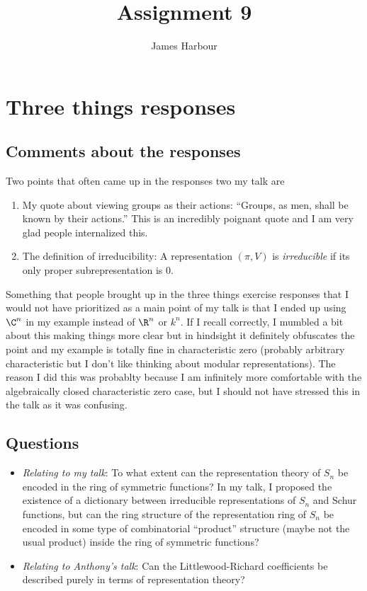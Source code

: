 \documentclass[12pt]{article}
\title{Assignment 9}
\author{James Harbour}
\begin{document}
\maketitle

\section{Three things responses}
\subsection{Comments about the responses}

Two points that often came up in the responses two my talk are
\begin{enumerate}
  \item My quote about viewing groups as their actions: ``Groups, as men, shall be known by their actions.'' This is an incredibly poignant quote and I am very glad people internalized this.
  \item The definition of irreducibility: A representation $ (\pi,V) $ is \textit{irreducible} if its only proper subrepresentation is $ 0 $.
\end{enumerate}

Something that people brought up in the three things exercise responses that I would not have prioritized as a main point of my talk is that I ended up using $ \C^{n} $ in my example instead of $ \R^{n} $ or $ k^{n} $. If I recall correctly, I mumbled a bit about this making things more clear but in hindsight it definitely obfuscates the point and my example is totally fine in characteristic zero (probably arbitrary characteristic but I don't like thinking about modular representations). The reason I did this was probablty because I am infinitely more comfortable with the algebraically closed characteristic zero case, but I should not have stressed this in the talk as it was confusing.

\subsection{Questions}

\begin{itemize}
  \item \textit{Relating to my talk}: To what extent can the representation theory of $ S_{n} $ be encoded in the ring of symmetric functions? In my talk, I proposed the existence of a dictionary between irreducible representations of $ S_{n} $ and Schur functions, but can the ring structure of the representation ring of $ S_{n} $ be encoded in some type of combinatorial ``product'' structure (maybe not the usual product) inside the ring of symmetric functions? 
  \item \textit{Relating to Anthony's talk}: Can the Littlewood-Richard coefficients be described purely in terms of representation theory?
\end{itemize}
\end{document}
